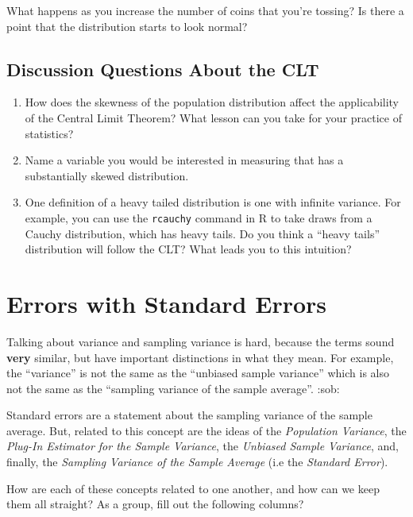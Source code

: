 \documentclass[
]{book}
\providecommand{\tightlist}{%
  \setlength{\itemsep}{0pt}\setlength{\parskip}{0pt}}
\theoremstyle{definition}
\theoremstyle{definition}
\theoremstyle{definition}
\theoremstyle{definition}
\theoremstyle{remark}
\begin{document}
What happens as you increase the number of coins that you're tossing? Is there a point that the distribution starts to look normal?

\hypertarget{discussion-questions-about-the-clt}{%
\subsection{Discussion Questions About the CLT}\label{discussion-questions-about-the-clt}}

\begin{enumerate}
\def\labelenumi{\arabic{enumi}.}
\tightlist
\item
  How does the skewness of the population distribution affect the applicability of the Central Limit Theorem? What lesson can you take for your practice of statistics?
\item
  Name a variable you would be interested in measuring that has a substantially skewed distribution.
\item
  One definition of a heavy tailed distribution is one with infinite variance. For example, you can use the \texttt{rcauchy} command in R to take draws from a Cauchy distribution, which has heavy tails. Do you think a ``heavy tails'' distribution will follow the CLT? What leads you to this intuition?
\end{enumerate}

\hypertarget{errors-with-standard-errors}{%
\section{Errors with Standard Errors}\label{errors-with-standard-errors}}

Talking about variance and sampling variance is hard, because the terms sound \textbf{very} similar, but have important distinctions in what they mean. For example, the ``variance'' is not the same as the ``unbiased sample variance'' which is also not the same as the ``sampling variance of the sample average''. :sob:

Standard errors are a statement about the sampling variance of the sample average. But, related to this concept are the ideas of the \emph{Population Variance}, the \emph{Plug-In Estimator for the Sample Variance}, the \emph{Unbiased Sample Variance}, and, finally, the \emph{Sampling Variance of the Sample Average} (i.e the \emph{Standard Error}).

How are each of these concepts related to one another, and how can we keep them all straight? As a group, fill out the following columns?
\end{document}
